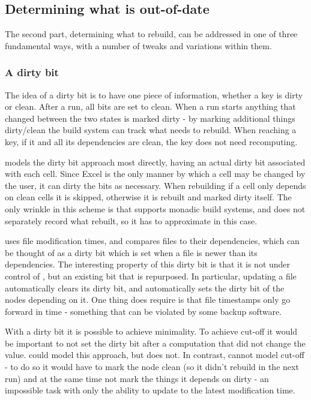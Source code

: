 \subsection{Determining what is out-of-date}

The second part, determining what to rebuild, can be addressed in one of three fundamental ways, with a number of tweaks and variations within them.

\subsubsection{A dirty bit}

The idea of a dirty bit is to have one piece of information, whether a key is dirty or clean. After a run, all bits are set to clean. When a run starts anything that changed between the two states is marked dirty - by marking additional things dirty/clean the build system can track what needs to rebuild. When reaching a key, if it and all its dependencies are clean, the key does not need recomputing.

\Excel models the dirty bit approach most directly, having an actual dirty bit associated with each cell. Since Excel is the only manner by which a cell may be changed by the user, it can dirty the bits as necessary. When rebuilding if a cell only depends on clean cells it is skipped, otherwise it is rebuilt and marked dirty itself. The only wrinkle in this scheme is that \Excel supports monadic build systems, and does not separately record what rebuilt, so it has to approximate in this case.

\Make uses file modification times, and compares files to their dependencies, which can be thought of as a dirty bit which is set when a file is newer than its dependencies. The interesting property of this dirty bit is that it is not under control of \Make, but an existing bit that is repurposed. In particular, updating a file automatically clears its dirty bit, and automatically sets the dirty bit of the nodes depending on it. One thing \Make does require is that file timestamps only go forward in time - something that can be violated by some backup software.

With a dirty bit it is possible to achieve minimality. To achieve cut-off it would be important to not set the dirty bit after a computation that did not change the value. \Excel could model this approach, but does not. In contrast, \Make cannot model cut-off - to do so it would have to mark the node clean (so it didn't rebuild in the next run) and at the same time not mark the things it depends on dirty - an impossible task with only the ability to update to the latest modification time.

